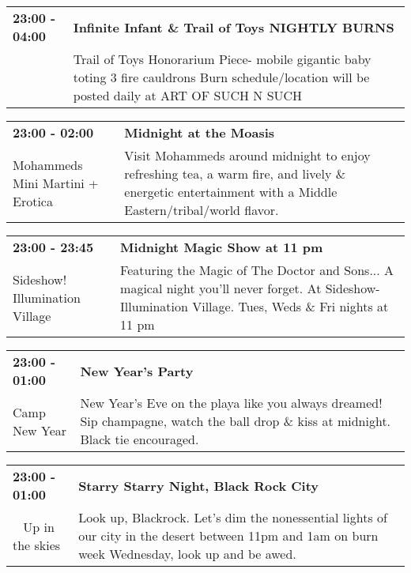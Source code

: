 \begin{tabular}{ p{1in} p{2.2in} }
    \textbf{23:00 - 04:00} & \textbf{Infinite Infant \& Trail of Toys NIGHTLY BURNS} \\
    ~ \newline  & Trail of Toys Honorarium Piece- mobile gigantic baby toting 3 fire cauldrons Burn schedule/location will be posted daily at ART OF SUCH N SUCH \\
    \hline 
\end{tabular}
    
\begin{tabular}{ p{1in} p{2.2in} }
    \textbf{23:00 - 02:00} & \textbf{Midnight at the Moasis} \\
    Mohammeds Mini Martini + Erotica \newline  & Visit Mohammeds around midnight to enjoy refreshing tea, a warm fire, and lively \& energetic entertainment with a Middle Eastern/tribal/world flavor. \\
    \hline 
\end{tabular}
    
\begin{tabular}{ p{1in} p{2.2in} }
    \textbf{23:00 - 23:45} & \textbf{Midnight Magic Show at 11 pm} \\
    Sideshow! \newline Illumination Village & Featuring the Magic of The Doctor and Sons... A magical night you'll never forget. At Sideshow- Illumination Village. Tues, Weds \& Fri nights at 11 pm \\
    \hline 
\end{tabular}
    
\begin{tabular}{ p{1in} p{2.2in} }
    \textbf{23:00 - 01:00} & \textbf{New Year's Party} \\
    Camp New Year \newline  & New Year's Eve on the playa like you always dreamed! Sip champagne, watch the ball drop \& kiss at midnight. Black tie encouraged. \\
    \hline 
\end{tabular}
    
\begin{tabular}{ p{1in} p{2.2in} }
    \textbf{23:00 - 01:00} & \textbf{Starry Starry Night, Black Rock City} \\
    ~ \newline Up in the skies & Look up, Blackrock. Let's dim the nonessential lights of our city in the desert between 11pm and 1am on burn week Wednesday, look up and be awed. \\
    \hline 
\end{tabular}
    
